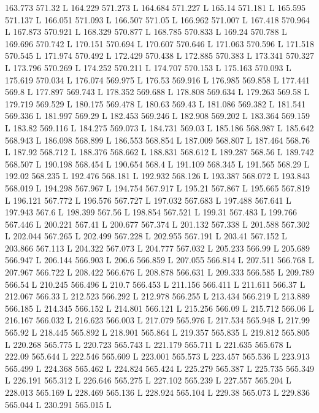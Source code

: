 163.773 571.32 L
164.229 571.273 L
164.684 571.227 L
165.14 571.181 L
165.595 571.137 L
166.051 571.093 L
166.507 571.05 L
166.962 571.007 L
167.418 570.964 L
167.873 570.921 L
168.329 570.877 L
168.785 570.833 L
169.24 570.788 L
169.696 570.742 L
170.151 570.694 L
170.607 570.646 L
171.063 570.596 L
171.518 570.545 L
171.974 570.492 L
172.429 570.438 L
172.885 570.383 L
173.341 570.327 L
173.796 570.269 L
174.252 570.211 L
174.707 570.153 L
175.163 570.093 L
175.619 570.034 L
176.074 569.975 L
176.53 569.916 L
176.985 569.858 L
177.441 569.8 L
177.897 569.743 L
178.352 569.688 L
178.808 569.634 L
179.263 569.58 L
179.719 569.529 L
180.175 569.478 L
180.63 569.43 L
181.086 569.382 L
181.541 569.336 L
181.997 569.29 L
182.453 569.246 L
182.908 569.202 L
183.364 569.159 L
183.82 569.116 L
184.275 569.073 L
184.731 569.03 L
185.186 568.987 L
185.642 568.943 L
186.098 568.899 L
186.553 568.854 L
187.009 568.807 L
187.464 568.76 L
187.92 568.712 L
188.376 568.662 L
188.831 568.612 L
189.287 568.56 L
189.742 568.507 L
190.198 568.454 L
190.654 568.4 L
191.109 568.345 L
191.565 568.29 L
192.02 568.235 L
192.476 568.181 L
192.932 568.126 L
193.387 568.072 L
193.843 568.019 L
194.298 567.967 L
194.754 567.917 L
195.21 567.867 L
195.665 567.819 L
196.121 567.772 L
196.576 567.727 L
197.032 567.683 L
197.488 567.641 L
197.943 567.6 L
198.399 567.56 L
198.854 567.521 L
199.31 567.483 L
199.766 567.446 L
200.221 567.41 L
200.677 567.374 L
201.132 567.338 L
201.588 567.302 L
202.044 567.265 L
202.499 567.228 L
202.955 567.191 L
203.41 567.152 L
203.866 567.113 L
204.322 567.073 L
204.777 567.032 L
205.233 566.99 L
205.689 566.947 L
206.144 566.903 L
206.6 566.859 L
207.055 566.814 L
207.511 566.768 L
207.967 566.722 L
208.422 566.676 L
208.878 566.631 L
209.333 566.585 L
209.789 566.54 L
210.245 566.496 L
210.7 566.453 L
211.156 566.411 L
211.611 566.37 L
212.067 566.33 L
212.523 566.292 L
212.978 566.255 L
213.434 566.219 L
213.889 566.185 L
214.345 566.152 L
214.801 566.121 L
215.256 566.09 L
215.712 566.06 L
216.167 566.032 L
216.623 566.003 L
217.079 565.976 L
217.534 565.948 L
217.99 565.92 L
218.445 565.892 L
218.901 565.864 L
219.357 565.835 L
219.812 565.805 L
220.268 565.775 L
220.723 565.743 L
221.179 565.711 L
221.635 565.678 L
222.09 565.644 L
222.546 565.609 L
223.001 565.573 L
223.457 565.536 L
223.913 565.499 L
224.368 565.462 L
224.824 565.424 L
225.279 565.387 L
225.735 565.349 L
226.191 565.312 L
226.646 565.275 L
227.102 565.239 L
227.557 565.204 L
228.013 565.169 L
228.469 565.136 L
228.924 565.104 L
229.38 565.073 L
229.836 565.044 L
230.291 565.015 L
